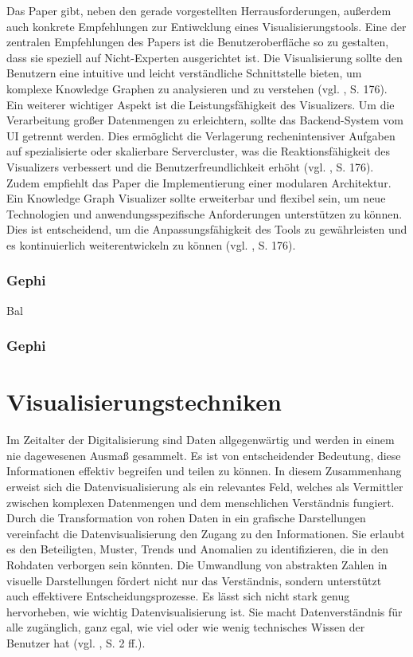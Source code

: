 Das Paper gibt, neben den gerade vorgestellten Herrausforderungen, außerdem auch konkrete Empfehlungen zur Entiwcklung eines Visualisierungstools. Eine der zentralen Empfehlungen des Papers ist die Benutzeroberfläche so zu gestalten, dass sie speziell auf Nicht-Experten ausgerichtet ist. Die Visualisierung sollte den Benutzern eine intuitive und leicht verständliche Schnittstelle bieten, um komplexe Knowledge Graphen zu analysieren und zu verstehen (vgl. \cite{kgVisualization:Nararatwong}, S. 176). Ein weiterer wichtiger Aspekt ist die Leistungsfähigkeit des Visualizers. Um die Verarbeitung großer Datenmengen zu erleichtern, sollte das Backend-System vom UI getrennt werden. Dies ermöglicht die Verlagerung rechenintensiver Aufgaben auf spezialisierte oder skalierbare Servercluster, was die Reaktionsfähigkeit des Visualizers verbessert und die Benutzerfreundlichkeit erhöht (vgl. \cite{kgVisualization:Nararatwong}, S. 176). Zudem empfiehlt das Paper die Implementierung einer modularen Architektur. Ein Knowledge Graph Visualizer sollte erweiterbar und flexibel sein, um neue Technologien und anwendungsspezifische Anforderungen unterstützen zu können. Dies ist entscheidend, um die Anpassungsfähigkeit des Tools zu gewährleisten und es kontinuierlich weiterentwickeln zu können (vgl. \cite{kgVisualization:Nararatwong}, S. 176).

\subsubsection{Gephi}

Bal 

\subsubsection{Gephi}

\section{Visualisierungstechniken}
\label{theory:vistechniques}

Im Zeitalter der Digitalisierung sind Daten allgegenwärtig und werden in einem nie dagewesenen Ausmaß gesammelt. Es ist von entscheidender Bedeutung, diese Informationen effektiv begreifen und teilen zu können. In diesem Zusammenhang erweist sich die Datenvisualisierung als ein relevantes Feld, welches als Vermittler zwischen komplexen Datenmengen und dem menschlichen Verständnis fungiert. Durch die Transformation von rohen Daten in ein grafische Darstellungen vereinfacht die Datenvisualisierung den Zugang zu den Informationen. Sie erlaubt es den Beteiligten, Muster, Trends und Anomalien zu identifizieren, die in den Rohdaten verborgen sein könnten. Die Umwandlung von abstrakten Zahlen in visuelle Darstellungen fördert nicht nur das Verständnis, sondern unterstützt auch effektivere Entscheidungsprozesse. Es lässt sich nicht stark genug hervorheben, wie wichtig Datenvisualisierung ist. Sie macht Datenverständnis für alle zugänglich, ganz egal, wie viel oder wie wenig technisches Wissen der Benutzer hat (vgl. \cite{unwin:WhyDataVisualization}, S. 2 ff.).

